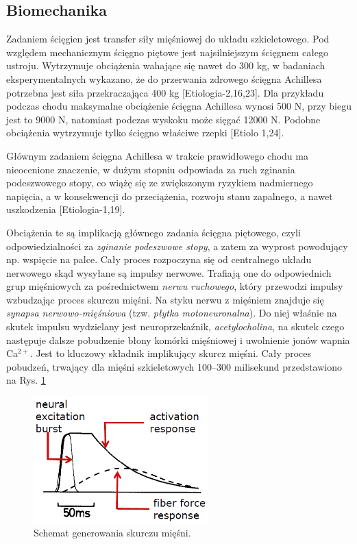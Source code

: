 \subsection{Biomechanika}
\label{Biomechanika}
Zadaniem ścięgien jest transfer siły mięśniowej do układu szkieletowego. Pod względem mechanicznym ścięgno piętowe jest najsilniejszym ścięgnem całego ustroju. Wytrzymuje obciążenia wahające się nawet do 300 kg, w badaniach eksperymentalnych wykazano, że do przerwania zdrowego ścięgna Achillesa potrzebna jest siła przekraczająca 400 kg [Etiologia-2,16,23]. Dla przykładu podczas chodu maksymalne obciążenie ścięgna Achillesa wynosi 500 N, przy biegu jest to 9000 N, natomiast podczas wyskoku może sięgać 12000 N. Podobne obciążenia wytrzymuje tylko ścięgno właściwe rzepki [Etiolo 1,24].

Głównym zadaniem ścięgna Achillesa w trakcie prawidłowego chodu ma nieocenione znaczenie, w dużym stopniu odpowiada za ruch zginania podeszwowego stopy, co wiążę się ze zwiększonym ryzykiem nadmiernego napięcia, a w konsekwencji do przeciążenia, rozwoju stanu zapalnego, a nawet uszkodzenia [Etiologia-1,19].

Obciążenia te są implikacją głównego zadania ścięgna piętowego, czyli odpowiedzialności za \textit{zginanie podeszwowe stopy}, a zatem za wyprost powodujący np. wspięcie na palce. Cały proces rozpoczyna się od centralnego układu nerwowego skąd wysyłane są impulsy nerwowe. Trafiają one do odpowiednich grup mięśniowych za pośrednictwem \textit{nerwu ruchowego}, który przewodzi impulsy wzbudzając proces skurczu mięśni. Na styku nerwu z mięśniem znajduje się \textit{synapsa nerwowo-mięśniowa} (tzw. \textit{płytka motoneuronalna}). Do niej właśnie na skutek impulsu wydzielany jest neuroprzekaźnik, \textit{acetylocholina}, na skutek czego następuje dalsze pobudzenie błony komórki mięśniowej i uwolnienie jonów wapnia Ca$^{2+}$. Jest to kluczowy składnik implikujący skurcz mięśni. Cały proces pobudzeń, trwający dla mięśni szkieletowych 100--300 milisekund przedstawiono na Rys. \ref{muscle-excitements} 
\begin{figure}[h!]
	\centering
	\includegraphics[width=0.6\textwidth]{figures/skurcz_miesni.png}
	\caption{Schemat generowania skurczu mięśni.}
	\label{muscle-excitements}
\end{figure}

